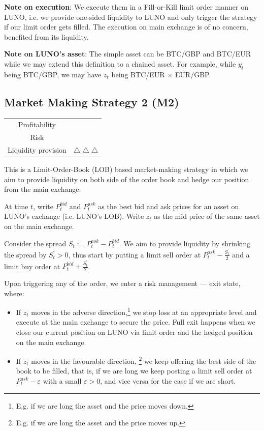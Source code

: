 \documentclass[12pt,a4paper]{article}
\begin{document}
\textbf{Note on execution}: We execute them in a Fill-or-Kill limit order manner on LUNO, i.e. we provide one-sided liquidity to LUNO and only trigger the strategy if our limit order gets filled. The execution on main exchange is of no concern, benefited from its liquidity.
	
\textbf{Note on LUNO's asset}: The simple asset can be BTC/GBP and BTC/EUR while we may extend this definition to a chained asset. For example, while $y_t$ being BTC/GBP, we may have $z_t$ being BTC/EUR $\times$ EUR/GBP.


\pagebreak
\subsection{Market Making Strategy 2 (M2)}

		\begin{table}[h]
	\centering
	\begin{tabular}{c|c}
		
		Profitability& \textdollaroldstyle \\
		
		Risk & \Radioactivity  \\
		
		Liquidity provision &$ \bigtriangleup \bigtriangleup  \bigtriangleup$\\
		
	\end{tabular}
\end{table}

This is a Limit-Order-Book (LOB) based market-making strategy in which we aim to provide liquidity on both side of the order book and hedge our position from the main exchange.

At time $t$, write $P^{bid}_t$ and $P^{ask}_t$ as the best bid and ask prices for an asset on LUNO's exchange (i.e. LUNO's LOB). Write $z_t$ as the mid price of the same asset on the main exchange.

Consider the spread $S_t := P^{ask}_t - P^{bid}_t$. We aim to provide liquidity by shrinking the spread by $S_t^\prime >0$, thus start by putting a limit sell order at $P^{ask}_t - \frac{S_t^\prime}{2}$ and a limit buy order at $P^{bid}_t + \frac{S_t^\prime}{2}$.

Upon triggering any of the order, we enter a risk management --- exit state, where: \begin{itemize}
	\item If $z_t$ moves in the adverse direction,\footnote{E.g. if we are long the asset and the price moves down.} we stop loss at an appropriate level and execute at the main exchange to secure the price. Full exit happens when we close our current position on LUNO via limit order and the hedged position on the main exchange.
	\item If $z_t$ moves in the favourable direction, \footnote{E.g. if we are long the asset and the price moves up.} we keep offering the best side of the book to be filled, that is, if we are long we keep posting a limit sell order at $P^{ask}_t - \varepsilon$ with a small $\varepsilon > 0$, and vice versa for the case if we are short.
\end{itemize}
\end{document}

